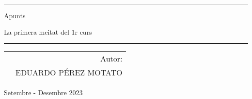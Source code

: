 \begin{titlepage}
\scshape

\centering
\vspace{1cm}
\raisebox{-\baselineskip}{\rule{\textwidth}{1px}}
\rule{\textwidth}{1px}
\vspace{0.01cm}

{\huge{{Apunts}}}\par \vspace{0.1cm}
La primera meitat del 1r curs

\rule{\textwidth}{2px}

\vspace{1cm}

\begin{tabularx}{\textwidth}{X r}
 & Autor:\\
 & \large{EDUARDO PÉREZ MOTATO} \\
\end{tabularx}

\vspace{1.3cm}


\vfill
Setembre - Desembre 2023

\end{titlepage}
